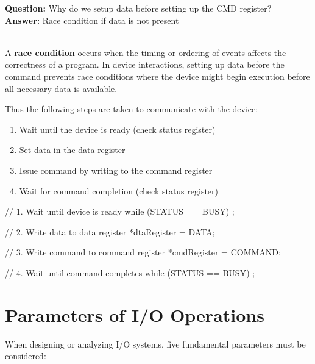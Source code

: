 \documentclass[../../compsys.tex]{subfiles}
\begin{document}
\begin{justify}
\textbf{Question:} Why do we setup data before setting up the CMD register? \\[5px]
\textbf{Answer:} Race condition if data is not present
\end{justify}

\begin{definition}
    \leavevmode \\
    A \textbf{race condition} occurs when the timing or ordering of events affects the correctness of a program. In device interactions, setting up data before the command prevents race conditions where the device might begin execution before all necessary data is available.
\end{definition}
\vspace{10px}

Thus the following steps are taken to communicate with the device:\\[5px]
\begin{minipage}{0.45\textwidth}
    \begin{enumerate}
        \item Wait until the device is ready (check status register)
        \item Set data in the data register
        \item Issue command by writing to the command register
        \item Wait for command completion (check status register)
    \end{enumerate}
\end{minipage}
\hfill
\vline
\hfill
\begin{minipage}{0.45\textwidth}
    \begin{cc}
// 1. Wait until device is ready
while (STATUS == BUSY) ;

// 2. Write data to data register
*dtaRegister = DATA;

// 3. Write command to command register
*cmdRegister = COMMAND;

// 4. Wait until command completes
while (STATUS == BUSY) ;
\end{cc}
\end{minipage}

\newpage
\section{Parameters of I/O Operations}

When designing or analyzing I/O systems, five fundamental parameters must be considered:
\end{document}
